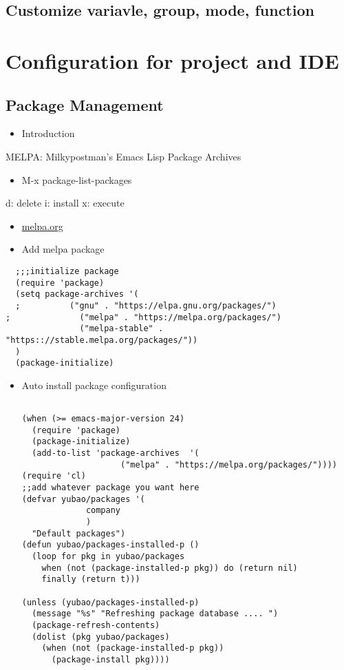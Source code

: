 \documentclass[11pt]{article}
\begin{document}
\subsection{Customize variavle, group, mode, function}
\label{sec:orgbfa79ef}

\section{Configuration for project and IDE}
\label{sec:org018c839}
\subsection{Package Management}
\label{sec:orgb7a6a43}
\begin{itemize}
\item Introduction
\end{itemize}
MELPA: Milkypostman's Emacs Lisp Package Archives
\begin{itemize}
\item M-x  package-list-packages
\end{itemize}
d: delete
i: install
x: execute
\begin{itemize}
\item \href{https://melpa.org/}{melpa.org}
\item Add melpa package
\end{itemize}
\begin{verbatim}
  ;;;initialize package
  (require 'package)
  (setq package-archives '(
  ;			 ("gnu" . "https://elpa.gnu.org/packages/")
;			   ("melpa" . "https://melpa.org/packages/")
			   ("melpa-stable" . "https:://stable.melpa.org/packages/"))
  )
  (package-initialize)
\end{verbatim}
\begin{itemize}
\item Auto install package configuration
\begin{verbatim}

(when (>= emacs-major-version 24)
  (require 'package)
  (package-initialize)
  (add-to-list 'package-archives  '(
				    ("melpa" . "https://melpa.org/packages/"))))
(require 'cl)
;;add whatever package you want here
(defvar yubao/packages '(
			 company
			 )
  "Default packages")
(defun yubao/packages-installed-p ()
  (loop for pkg in yubao/packages
	when (not (package-installed-p pkg)) do (return nil)
	finally (return t)))

(unless (yubao/packages-installed-p)
  (message "%s" "Refreshing package database .... ")
  (package-refresh-contents)
  (dolist (pkg yubao/packages)
    (when (not (package-installed-p pkg))
      (package-install pkg))))
\end{verbatim}
\end{itemize}
\end{document}
